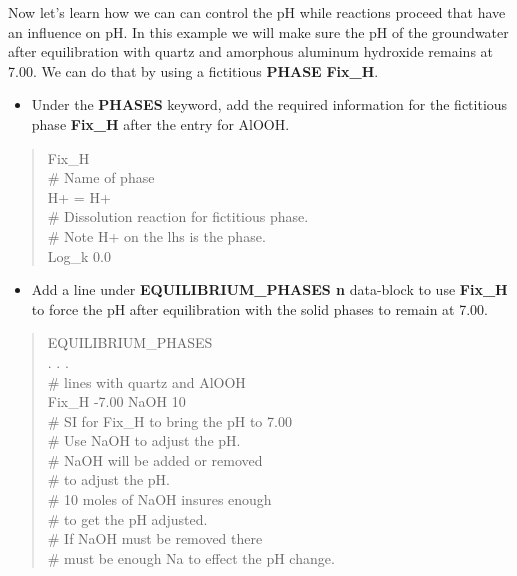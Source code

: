 Now let's learn how we can can control the pH while reactions proceed that have an influence on pH. 
In this example we will make sure the pH of the groundwater after equilibration with quartz and 
amorphous aluminum hydroxide remains at 7.00.
We can do that by using a fictitious {\color{red}\textbf{PHASE}} \textbf{Fix\_H}.  

\begin{itemize}
\item Under the {\color{red}\textbf{PHASES}} keyword, 
add the required information for the fictitious phase 
\textbf{Fix\_H} after the entry for AlOOH.
\end{itemize}

\begin{quote}
{\color{red}Fix\_H \\        
\# Name of phase \\
H+  =  H+      \\
\# Dissolution reaction for fictitious phase.  \\ 
\# Note H+ on the lhs is the phase. \\
Log\_k 0.0 }\\
\end{quote}


\begin{itemize}
\item Add a line under {\color{red}\textbf{EQUILIBRIUM\_PHASES n}} data-block to 
use \textbf{Fix\_H} to force the pH after equilibration with the solid phases to remain at 7.00.
\end{itemize}



\begin{quote}
{\color{red}EQUILIBRIUM\_PHASES \\
. . .		\\
\# lines with quartz and AlOOH \\
Fix\_H  -7.00 NaOH 10	\\
\# SI for Fix\_H to bring the pH to 7.00 \\
\# Use NaOH to adjust the pH. \\
\# NaOH will be added or removed \\
\# to adjust the pH. \\
\# 10 moles of NaOH insures enough \\
\# to get the pH adjusted.  \\
\# If NaOH must be removed there \\
\# must be enough Na to effect the pH change. }\\
\end{quote}

